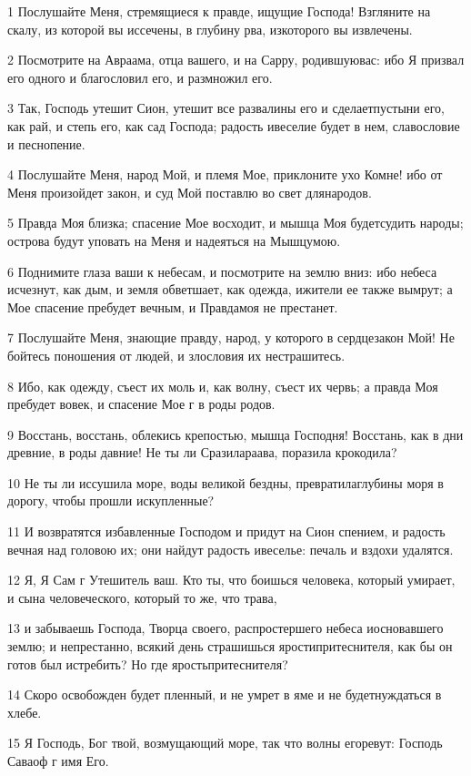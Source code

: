 \par 1 Послушайте Меня, стремящиеся к правде, ищущие Господа! Взгляните на скалу, из которой вы иссечены, в глубину рва, изкоторого вы извлечены.
\par 2 Посмотрите на Авраама, отца вашего, и на Сарру, родившуювас: ибо Я призвал его одного и благословил его, и размножил его.
\par 3 Так, Господь утешит Сион, утешит все развалины его и сделаетпустыни его, как рай, и степь его, как сад Господа; радость ивеселие будет в нем, славословие и песнопение.
\par 4 Послушайте Меня, народ Мой, и племя Мое, приклоните ухо Комне! ибо от Меня произойдет закон, и суд Мой поставлю во свет длянародов.
\par 5 Правда Моя близка; спасение Мое восходит, и мышца Моя будетсудить народы; острова будут уповать на Меня и надеяться на Мышцумою.
\par 6 Поднимите глаза ваши к небесам, и посмотрите на землю вниз: ибо небеса исчезнут, как дым, и земля обветшает, как одежда, ижители ее также вымрут; а Мое спасение пребудет вечным, и Правдамоя не престанет.
\par 7 Послушайте Меня, знающие правду, народ, у которого в сердцезакон Мой! Не бойтесь поношения от людей, и злословия их нестрашитесь.
\par 8 Ибо, как одежду, съест их моль и, как волну, съест их червь; а правда Моя пребудет вовек, и спасение Мое г в роды родов.
\par 9 Восстань, восстань, облекись крепостью, мышца Господня! Восстань, как в дни древние, в роды давние! Не ты ли Сразилараава, поразила крокодила?
\par 10 Не ты ли иссушила море, воды великой бездны, превратилаглубины моря в дорогу, чтобы прошли искупленные?
\par 11 И возвратятся избавленные Господом и придут на Сион спением, и радость вечная над головою их; они найдут радость ивеселье: печаль и вздохи удалятся.
\par 12 Я, Я Сам г Утешитель ваш. Кто ты, что боишься человека, который умирает, и сына человеческого, который то же, что трава,
\par 13 и забываешь Господа, Творца своего, распростершего небеса иосновавшего землю; и непрестанно, всякий день страшишься яростипритеснителя, как бы он готов был истребить? Но где яростьпритеснителя?
\par 14 Скоро освобожден будет пленный, и не умрет в яме и не будетнуждаться в хлебе.
\par 15 Я Господь, Бог твой, возмущающий море, так что волны егоревут: Господь Саваоф г имя Его.
